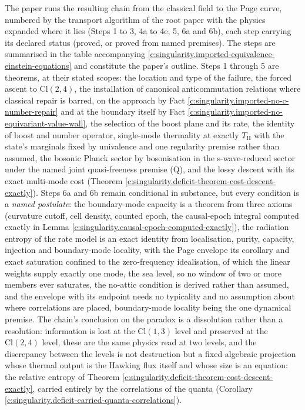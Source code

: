 \documentclass[11pt]{article}
\theoremstyle{definition}
\theoremstyle{plain}
\providecommand{\Cl}{}\renewcommand{\Cl}{\mathrm{Cl}}
\providecommand{\TH}{}\renewcommand{\TH}{T_{\mathrm{H}}}
\begin{document}
The paper runs the resulting chain from the classical field to the Page curve, numbered by the transport algorithm of the root paper with the physics expanded where it lies (Steps 1 to 3, 4a to 4e, 5, 6a and 6b), each step carrying its declared status (proved, or proved from named premises). The steps are summarised in the table accompanying \ref{c:singularity.imported-equivalence-einstein-equations} and constitute the paper's outline. Steps 1 through 5 are theorems, at their stated scopes: the location and type of the failure, the forced ascent to $\Cl(2,4)$, the installation of canonical anticommutation relations where classical repair is barred, on the approach by Fact \ref{c:singularity.imported-no-c-number-repair} and at the boundary itself by Fact \ref{c:singularity.imported-no-equivariant-value-wall}, the selection of the boost plane and its rate, the identity of boost and number operator, single-mode thermality at exactly $\TH$ with the state's marginals fixed by univalence and one regularity premise rather than assumed, the bosonic Planck sector by bosonisation in the s-wave-reduced sector under the named joint quasi-freeness premise (Q), and the lossy descent with its exact multi-mode cost (Theorem \ref{c:singularity.deficit-theorem-cost-descent-exactly}). Steps 6a and 6b remain conditional in substance, but every condition is a \emph{named postulate}: the boundary-mode capacity is a theorem from three axioms (curvature cutoff, cell density, counted epoch, the causal-epoch integral computed exactly in Lemma \ref{c:singularity.causal-epoch-computed-exactly}), the radiation entropy of the rate model is an exact identity from localisation, purity, capacity, injection and boundary-mode locality, with the Page envelope its corollary and exact saturation confined to the zero-frequency idealisation, of which the linear weights supply exactly one mode, the sea level, so no window of two or more members ever saturates, the no-attic condition is derived rather than assumed, and the envelope with its endpoint needs no typicality and no assumption about where correlations are placed, boundary-mode locality being the one dynamical premise. The chain's conclusion on the paradox is a dissolution rather than a resolution: information is lost at the $\Cl(1,3)$ level and preserved at the $\Cl(2,4)$ level, these are the same physics read at two levels, and the discrepancy between the levels is not destruction but a fixed algebraic projection whose thermal output is the Hawking flux itself and whose size is an equation: the relative entropy of Theorem \ref{c:singularity.deficit-theorem-cost-descent-exactly}, carried entirely by the correlations of the quanta (Corollary \ref{c:singularity.deficit-carried-quanta-correlations}).
\end{document}
